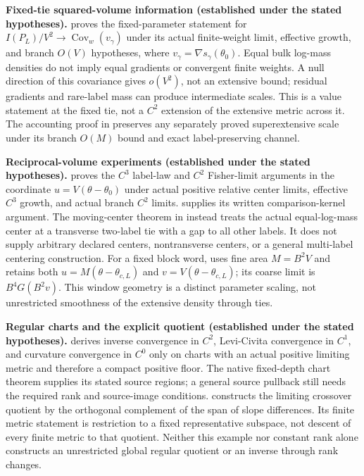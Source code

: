 \begin{description}
\textbf{Fixed-tie squared-volume information (established under the stated hypotheses).}
 proves the fixed-parameter statement
for $I(P_L)/V^2\to\operatorname{Cov}_w(v_\gamma)$ under its actual
finite-weight limit, effective growth, and branch $O(V)$ hypotheses,
where $v_\gamma=\nabla s_\gamma(\theta_0)$.
Equal bulk log-mass densities do not imply equal gradients or convergent
finite weights. A null direction of this covariance gives $o(V^2)$,
not an extensive bound; residual gradients and rare-label mass can
produce intermediate scales. This is a value statement at the fixed
tie, not a $C^2$ extension of the extensive metric across it.
The accounting proof in 
preserves any separately proved superextensive scale under its branch
$O(M)$ bound and exact label-preserving channel. 

\textbf{Reciprocal-volume experiments (established under the stated hypotheses).}
 proves the $C^3$ label-law
and $C^2$ Fisher-limit arguments in the coordinate
$u=V(\theta-\theta_0)$ under actual positive relative center limits,
effective $C^3$ growth, and actual branch $C^2$ limits.
 supplies its written
comparison-kernel argument. The moving-center theorem in
 instead treats the actual
equal-log-mass center at a transverse two-label tie with a gap to all
other labels. It does not supply arbitrary declared centers,
nontransverse centers, or a general multi-label centering construction.
For a fixed block word, 
uses fine area $M=B^2V$ and retains both $u=M(\theta-\theta_{c,L})$
and $v=V(\theta-\theta_{c,L})$; its coarse limit is $B^4G(B^2v)$.
This window geometry is a distinct parameter scaling, not unrestricted
smoothness of the extensive density through ties. 

\textbf{Regular charts and the explicit quotient
(established under the stated hypotheses).}
 derives inverse convergence
in $C^2$, Levi-Civita convergence in $C^1$, and curvature convergence
in $C^0$ only on charts with an actual positive limiting metric and
therefore a compact positive floor. The native fixed-depth chart theorem
 supplies its stated
source regions; a general source pullback still needs the required
rank and source-image conditions.
 constructs the limiting crossover
quotient by the orthogonal complement of the span of slope differences.
Its finite metric statement is restriction to a fixed representative
subspace, not descent of every finite metric to that quotient.
Neither this example nor constant rank alone constructs an unrestricted
global regular quotient or an inverse through rank changes.


\end{description}

